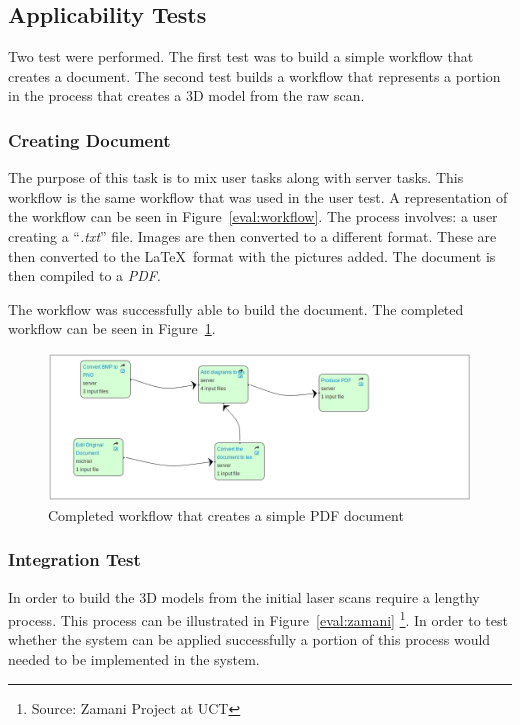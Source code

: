 \documentclass[12pt,a4paper]{report}
\begin{document}
\subsection{Applicability Tests}
Two test were performed. The first test was to build a simple workflow that
creates a document. The second test builds a workflow that represents a portion
in the process that creates a 3D model from the raw scan.




\subsubsection{Creating Document}
The purpose of this task is to mix user tasks along with server tasks. This
workflow is the same workflow that was used in the user test. A representation
of the workflow can be seen in Figure~\ref{eval:workflow}.
The process involves: a user creating a ``\emph{.txt}'' file. Images are then
converted to a different format. These are then converted to the \LaTeX~format
with the pictures added. The document is then compiled to a \emph{PDF}.

The workflow was successfully able to build the document. The completed workflow
can be seen in Figure~\ref{eval:document}.

\begin{figure}[!h]
    \begin{center}
        \includegraphics[scale=0.45]{figures/document_test.png}
    \end{center}
    \caption{Completed workflow that creates a simple PDF document}
    \label{eval:document}
\end{figure}

\subsubsection{Integration Test}
In order to build the 3D models from the initial laser scans require a lengthy
process. This process can be illustrated in Figure~\ref{eval:zamani}
\footnote{Source: Zamani Project at UCT}.
 In order
to test whether the system can be applied successfully a portion of this process
would needed to be implemented in the system.
\end{document}
